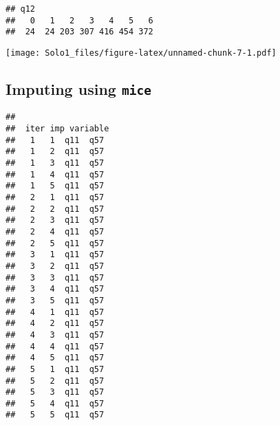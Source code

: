 \documentclass[]{article}
\newenvironment{Shaded}{\begin{snugshade}}{\end{snugshade}}
\newcommand{\KeywordTok}[1]{\textcolor[rgb]{0.13,0.29,0.53}{\textbf{#1}}}
\newcommand{\DataTypeTok}[1]{\textcolor[rgb]{0.13,0.29,0.53}{#1}}
\newcommand{\DecValTok}[1]{\textcolor[rgb]{0.00,0.00,0.81}{#1}}
\newcommand{\StringTok}[1]{\textcolor[rgb]{0.31,0.60,0.02}{#1}}
\newcommand{\OperatorTok}[1]{\textcolor[rgb]{0.81,0.36,0.00}{\textbf{#1}}}
\newcommand{\NormalTok}[1]{#1}
\begin{document}
\begin{verbatim}
## q12
##   0   1   2   3   4   5   6 
##  24  24 203 307 416 454 372
\end{verbatim}

\begin{Shaded}
\end{Shaded}

\texttt{[image: Solo1\_files/figure-latex/unnamed-chunk-7-1.pdf]}

\subsection{\texorpdfstring{Imputing using
\texttt{mice}}{Imputing using mice}}\label{imputing-using-mice}

\begin{Shaded}
\end{Shaded}

\begin{verbatim}
## 
##  iter imp variable
##   1   1  q11  q57
##   1   2  q11  q57
##   1   3  q11  q57
##   1   4  q11  q57
##   1   5  q11  q57
##   2   1  q11  q57
##   2   2  q11  q57
##   2   3  q11  q57
##   2   4  q11  q57
##   2   5  q11  q57
##   3   1  q11  q57
##   3   2  q11  q57
##   3   3  q11  q57
##   3   4  q11  q57
##   3   5  q11  q57
##   4   1  q11  q57
##   4   2  q11  q57
##   4   3  q11  q57
##   4   4  q11  q57
##   4   5  q11  q57
##   5   1  q11  q57
##   5   2  q11  q57
##   5   3  q11  q57
##   5   4  q11  q57
##   5   5  q11  q57
\end{verbatim}
\end{document}
